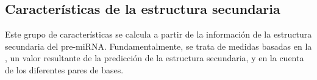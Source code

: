 \subsection{Características de la estructura secundaria}
Este grupo de características se calcula a partir de la información de
la estructura secundaria del pre-miRNA. Fundamentalmente, se trata de
medidas basadas en la , un valor resultante de
la predicción de la estructura secundaria, y en la cuenta de los
diferentes pares de bases.
